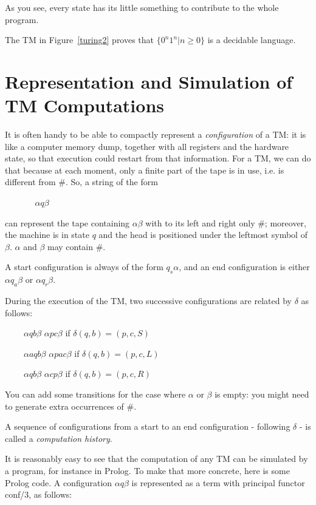 As you see, every state has its little something to contribute to the
whole program.


The TM in Figure~\ref{turing2} proves that
%
$\{0^n1^n|n \geq 0\}$ is a decidable language.


\section{Representation and Simulation of TM Computations}

It is often handy to be able to compactly represent a {\em
  configuration} of a TM: it is like a computer memory dump, together
with all registers and the hardware state, so that execution could
restart from that information. For a TM, we can do that because at
each moment, only a finite part of the tape is in use, i.e. is
different from \#. So, a string of the form

$~~~~~~~~~~~~~~~~\alpha q \beta$

can represent the tape containing $\alpha\beta$ with to its left and
right only \#; moreover, the machine is in state $q$ and the head is
positioned under the leftmost symbol of $\beta$. $\alpha$ and $\beta$
may contain \#.

A start configuration is always of the form $q_s\alpha$, and an end
configuration is either $\alpha q_a \beta$ or $\alpha q_r \beta$.

During the execution of the TM, two successive configurations are
related by $\delta$ as follows:


$~~~~~~~~~~\alpha q b \beta$ \rpijl $\alpha p c \beta$ if $\delta(q,b) = (p,c,S)$

$~~~~~~~~~~\alpha a q b \beta$ \rpijl $\alpha p a c \beta$ if $\delta(q,b) = (p,c,L)$

$~~~~~~~~~~\alpha q b \beta$ \rpijl $\alpha c p \beta$ if $\delta(q,b) = (p,c,R)$

You can add some transitions for the case where $\alpha$ or $\beta$ is
empty: you might need to generate extra occurrences of \#.


A sequence of configurations from a start to an end configuration -
following $\delta$ - is called a {\em computation history}.

It is reasonably easy to see that the computation of any TM can be
simulated by a program, for instance in Prolog. To make that more
concrete, here is some Prolog code. A configuration $\alpha q \beta$
is represented as a term with principal functor conf/3, as follows:

